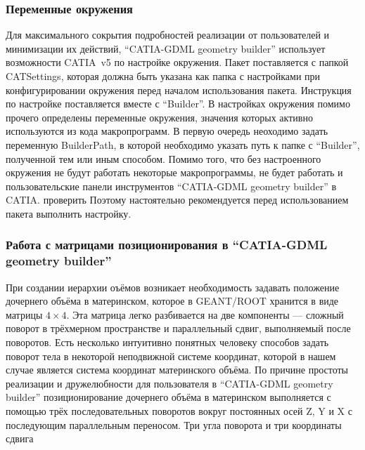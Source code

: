 \subsubsection{Переменные окружения}\label{sec:secBuilderEnv}

Для максимального сокрытия подробностей реализации от пользователей и минимизации их действий, ``CATIA-GDML geometry builder'' использует возможности CATIA~v5 по настройке окружения. Пакет поставляется с папкой CATSettings, которая должна быть указана как папка с настройками при конфигурировании окружения перед началом использования пакета. Инструкция по настройке поставляется вместе с ``Builder''. В настройках окружения помимо прочего определены переменные окружения, значения которых активно используются из кода макропрограмм. В первую очередь неоходимо задать переменную BuilderPath, в которой необходимо указать путь к папке с ``Builder'', полученной тем или иным способом. Помимо того, что без настроенного окружения не будут работать некоторые макропрограммы, не будет работать и пользовательские панели инструментов ``CATIA-GDML geometry builder'' в CATIA. проверить \todo Поэтому настоятельно рекомендуется перед использованием пакета выполнить настройку.

%                                        

\subsubsection{Работа с матрицами позиционирования в ``CATIA-GDML geometry builder''}\label{sec:secMatrices}

При создании иерархии оъёмов возникает необходимость задавать положение дочернего объёма в материнском, которое в GEANT/ROOT хранится в виде матрицы $4 \times 4$. Эта матрица легко разбивается на две компоненты --- сложный поворот в трёхмерном пространстве и параллельный сдвиг, выполняемый после поворотов. Есть несколько интуитивно понятных человеку способов задать поворот тела в некоторой неподвижной системе координат, которой в нашем случае является система координат материнского объёма. По причине простоты реализации и дружелюбности для пользователя в ``CATIA-GDML geometry builder'' позиционирование дочернего объёма в материнском выполняется с помощью трёх последовательных поворотов вокруг постоянных осей Z, Y и X с последующим параллельным переносом. Три угла поворота и три координаты сдвига

